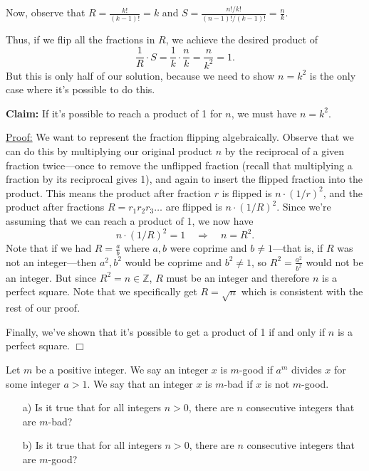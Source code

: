 \begin{solution}
Now, observe that $\displaystyle R=\frac{k!}{(k-1)!} = k$ and $\displaystyle S=\frac{n!/k!}{(n-1)!/(k-1)!} = \frac{n}{k}$.

Thus, if we flip all the fractions in $R$, we achieve the desired product of
\[
    \frac{1}{R} \cdot S = \frac{1}{k} \cdot \frac{n}{k} = \frac{n}{k^2} = 1.
\]
But this is only half of our solution, because we need to show $n=k^2$ is the only case where it's possible to do this.

\textbf{Claim:} If it's possible to reach a product of 1 for $n$, we must have $n=k^2$.%

\underline{Proof:} We want to represent the fraction flipping algebraically. Observe that we can do this by multiplying our original product $n$ by the reciprocal of a given fraction twice---once to remove the unflipped fraction (recall that multiplying a fraction by its reciprocal gives 1), and again to insert the flipped fraction into the product. This means the product after fraction $r$ is flipped is $n\cdot(1/r)^2$, and the product after fractions $R=r_1r_2r_3\dots$ are flipped is $n\cdot(1/R)^2$. Since we're assuming that we can reach a product of 1, we now have
\[
    n\cdot(1/R)^2 = 1 \quad \Rightarrow \quad n=R^2.
\]
Note that if we had $R=\frac{a}{b}$ where $a,b$ were coprime and $b\neq1$---that is, if $R$ was not an integer---then $a^2,b^2$ would be coprime and $b^2\neq1$, so $R^2=\frac{a^2}{b^2}$ would not be an integer. But since $R^2=n\in\mathbb{Z}$, $R$ must be an integer and therefore $n$ is a perfect square. Note that we specifically get $R=\sqrt{n}$ which is consistent with the rest of our proof.

Finally, we've shown that it's possible to get a product of 1 if and only if $n$ is a perfect square. $\Box$
\end{solution}

\begin{problem}
    Let $m$ be a positive integer. We say an integer $x$ is $m$-good if $a^m$ divides $x$ for some integer $a>1$. We say that an integer $x$ is $m$-bad if $x$ is not $m$-good. \smallbreak
    
    \begin{itemize}
        \item[a)] Is it true that for all integers $n>0$, there are $n$ consecutive integers that are $m$-bad? 
        \item[b)] Is it true that for all integers $n>0$, there are $n$ consecutive integers that are $m$-good? 
    \end{itemize}
\end{problem}

